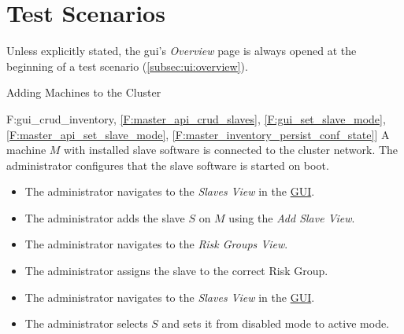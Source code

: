 \documentclass[a4paper, 11pt]{article}
\makeatletter
\def\namedlabel#1#2{\begingroup
    #2%
    \def\@currentlabel{#2}%
    \phantomsection\label{#1}\endgroup
}
\newcommand{\oitem}[2]{
  \@ifundefined{c@oitem#1}{\newcounter{oitem#1}}{} %
  \addtocounter{oitem#1}{10}
  \item[\namedlabel{#1:#2}{/#1\arabic{oitem#1}/}]
}
\newcommand{\testsequence}[3][]{
	\begin{description}[leftmargin=!,labelwidth=\widthof{\bfseries Preconditions}]
		\ifthenelse{\equal{#1}{}}
		{} %
		{\item[Tests] #1}
		\item[Preconditions] #2
		\item[Steps] #3
	\end{description}
}
\let\oldsection\section
\renewcommand\section{\clearpage\oldsection}
\makeatother
\begin{document}



\section{Test Scenarios}
Unless explicitly stated, the \acrshort{gui}'s \textit{Overview} page is always opened at the beginning of a test scenario (\ref{subsec:ui:overview}).

\begin{description}

\oitem{TS}{} Adding Machines to the Cluster
\testsequence
[\ref{F:gui_crud_inventory}, \ref{F:master_api_crud_slaves}, \ref{F:gui_set_slave_mode}, \ref{F:master_api_set_slave_mode}, \ref{F:master_inventory_persist_conf_state}]
{
	A machine $M$ with installed \gls{slave} software is connected to the \gls{cluster} network. The \gls{administrator} configures that the \gls{slave} software is started on boot.
}
{
	\begin{itemize}
		\item The \gls{administrator} navigates to the \textit{Slaves View} in the \hyperref[SM:GUI]{GUI}.
		\item The \gls{administrator} adds the slave $S$ on $M$ using the \textit{Add Slave View}.
		\item The \gls{administrator} navigates to the \textit{Risk Groups View}.
		\item The \gls{administrator} assigns the slave to the correct Risk Group.
		\item The \gls{administrator} navigates to the \textit{Slaves View} in the \hyperref[SM:GUI]{GUI}.
		\item The \gls{administrator} selects $S$ and sets it from \gls{disabled mode} to \gls{active mode}.
	\end{itemize}
}


\end{description}
\end{document}
